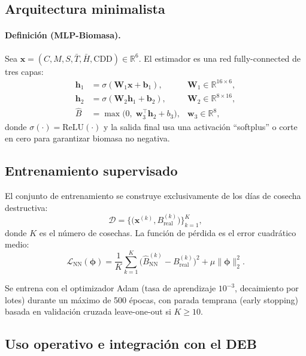 \subsection{Arquitectura minimalista}

\paragraph{Definición (MLP-Biomasa).}
Sea $\mathbf{x} = (C, M, S, \bar{T}, \bar{H}, \mathrm{CDD}) \in \mathbb{R}^6$. El estimador es una red fully-connected de tres capas:
\begin{align}
\mathbf{h}_1 &= \sigma( \mathbf{W}_1 \mathbf{x} + \mathbf{b}_1 ), & \mathbf{W}_1 \in \mathbb{R}^{16 \times 6}, \\
\mathbf{h}_2 &= \sigma( \mathbf{W}_2 \mathbf{h}_1 + \mathbf{b}_2 ), & \mathbf{W}_2 \in \mathbb{R}^{8 \times 16}, \\
\hat{B} &= \max\bigl(0,\; \mathbf{w}_3^{\top} \mathbf{h}_2 + b_3 \bigr), & \mathbf{w}_3 \in \mathbb{R}^8,
\end{align}
donde $\sigma(\cdot) = \mathrm{ReLU}(\cdot)$ y la salida final usa una activación ``softplus'' o corte en cero para garantizar biomasa no negativa.

\subsection{Entrenamiento supervisado}

El conjunto de entrenamiento se construye exclusivamente de los días de cosecha destructiva:
\begin{equation}
\mathcal{D} = \bigl\{ \bigl(\mathbf{x}^{(k)}, B^{(k)}_{\text{real}}\bigr) \bigr\}_{k=1}^{K},
\end{equation}
donde $K$ es el número de cosechas. La función de pérdida es el error cuadrático medio:
\begin{equation}
\mathcal{L}_{\text{NN}}(\boldsymbol{\phi}) = \frac{1}{K} \sum_{k=1}^{K} \bigl( \hat{B}_{\text{NN}}^{(k)} - B^{(k)}_{\text{real}} \bigr)^2 + \mu \|\boldsymbol{\phi}\|_2^2.
\end{equation}

Se entrena con el optimizador Adam (tasa de aprendizaje $10^{-3}$, decaimiento por lotes) durante un máximo de 500 épocas, con parada temprana (early stopping) basada en validación cruzada leave-one-out si $K \geq 10$.

\subsection{Uso operativo e integración con el DEB}

